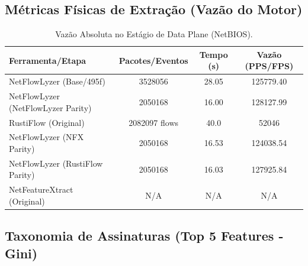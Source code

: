\documentclass[11pt,a4paper]{article}
\begin{document}
\subsection{Métricas Físicas de Extração (Vazão do Motor)}
\begin{table}[H]
\centering
\begin{threeparttable}
\begin{tabular}{lccc}
\toprule
\textbf{Ferramenta/Etapa} & \textbf{Pacotes/Eventos} & \textbf{Tempo (s)} & \textbf{Vazão (PPS/FPS)} \\
\midrule
NetFlowLyzer (Base/495f) & 3528056 & 28.05 & 125779.40 \\
NetFlowLyzer (NetFlowLyzer Parity) & 2050168 & 16.00 & 128127.99 \\
RustiFlow (Original) & 2082097 flows & 40.0 & 52046 \\
NetFlowLyzer (NFX Parity) & 2050168 & 16.53 & 124038.54 \\
NetFlowLyzer (RustiFlow Parity) & 2050168 & 16.03 & 127925.84 \\
NetFeatureXtract (Original) & N/A & N/A & N/A \\
\bottomrule
\end{tabular}
\end{threeparttable}
\caption{Vazão Absoluta no Estágio de Data Plane (NetBIOS).}
\end{table}

\subsection{Taxonomia de Assinaturas (Top 5 Features - Gini)}
\begin{table}[H]
\centering
{}
\caption{Principais atributos de correlação estocástica por limiar dimensional (NetBIOS).}
\end{table}
\end{document}
